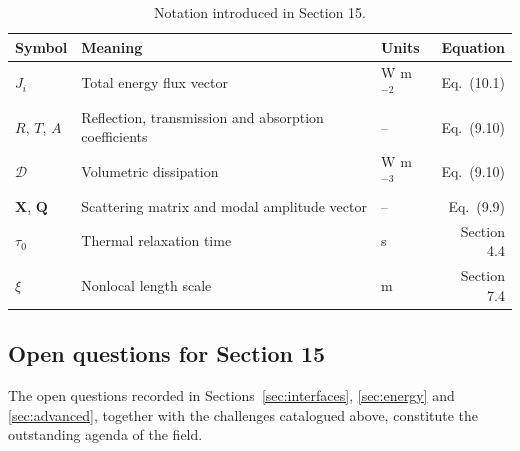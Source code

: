 \begin{table}[h]
\centering
\small
\caption{Notation introduced in Section 15.}
\label{tab:notation-sec15}
\begin{tabularx}{\textwidth}{@{}lXlr@{}}
\toprule
\textbf{Symbol} & \textbf{Meaning} & \textbf{Units} & \textbf{Equation} \\
\midrule
$J_i$ & Total energy flux vector & W m$^{-2}$ & Eq.~(10.1) \\
$R$, $T$, $A$ & Reflection, transmission and absorption coefficients & -- & Eq.~(9.10) \\
$\mathcal{D}$ & Volumetric dissipation & W m$^{-3}$ & Eq.~(9.10) \\
$\bm{X}$, $\bm{Q}$ & Scattering matrix and modal amplitude vector & -- & Eq.~(9.9) \\
$\tau_0$ & Thermal relaxation time & s & Section 4.4 \\
$\xi$ & Nonlocal length scale & m & Section 7.4 \\
\bottomrule
\end{tabularx}
\end{table}

\subsection{Open questions for Section 15}

The open questions recorded in Sections~\ref{sec:interfaces}, \ref{sec:energy} and \ref{sec:advanced}, together with the challenges catalogued above, constitute the outstanding agenda of the field.

